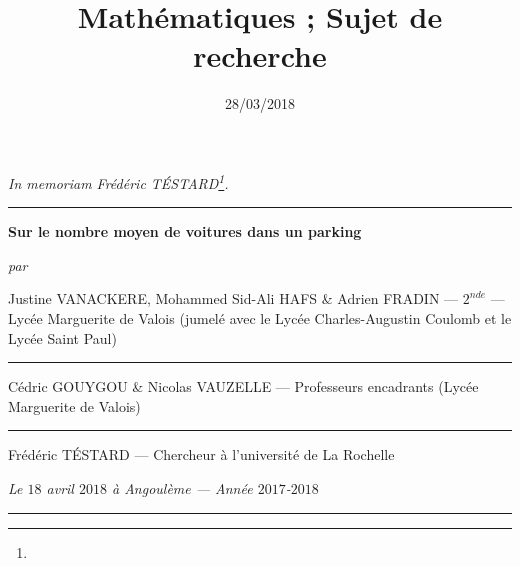\documentclass[a4paper,francais,11pt]{article}
\title{Mathématiques ; Sujet de recherche}
\date{28/03/2018}
\author{}
\begin{document}
\newcommand{\python}[1]{\texttt|#1|}%

\newcommand{\newDef}{\stepcounter{def} \textbf{\underline{Définition n$^{\underline{o}} \thedef$ :}} }
\renewcommand*{\abstract}{\footnotesize\textbf{\emph{\underline{Résumé}}. ---}\scriptsize}
\renewcommand*{\contentsname}{\footnotesize\textbf{Table des matières}\scriptsize}

\renewcommand*{\labelitemi}{--}
\renewcommand*{\labelitemii}{$\bullet$}
\renewcommand*{\labelenumi}{{\textbf{\arabic{enumi})}}}%
\renewcommand*{\labelenumii}{{\alph{enumii})}}
\newcommand{\claim}{\hfill\square}


\begin{center}
\scriptsize{\emph{In memoriam Frédéric TÉSTARD\footnote{}.}}
\end{center}

\begin{center}
\rule[0.5ex]{\textwidth}{0.5mm}
\vspace*{0.5cm}

{\Large \textbf{Sur le nombre moyen de voitures dans un parking} }
\vspace*{0.5cm}

\emph{par}
\vspace*{0.5cm}

{\scriptsize Justine VANACKERE, Mohammed Sid-Ali HAFS \& Adrien FRADIN --- $2^{nde}$ --- Lycée Marguerite de Valois}
{\scriptsize (jumelé avec le Lycée Charles-Augustin Coulomb et le Lycée Saint Paul)}

\rule[0.5ex]{1.5cm}{0.1mm}

{\scriptsize Cédric GOUYGOU \& Nicolas VAUZELLE --- Professeurs encadrants (Lycée Marguerite de Valois)}

\rule[0.5ex]{1.5cm}{0.1mm}

{\scriptsize Frédéric TÉSTARD --- Chercheur à l'université de La Rochelle}

\vspace*{0.5cm}
\emph{Le $18$ avril $2018$ à Angoulème --- Année $2017$-$2018$}

\vspace*{0.5cm}
\rule[0.5ex]{7cm}{0.5mm}
\vspace*{0.75cm}

\end{center}
\end{document}
